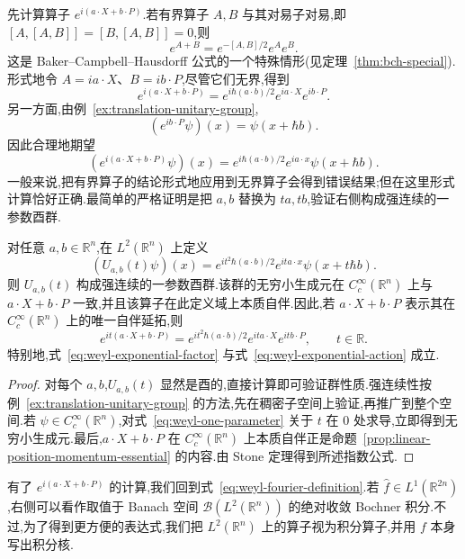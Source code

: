 先计算算子 $e^{i(a\cdot X+b\cdot P)}$.若有界算子 $A,B$ 与其对易子对易,即 $[A,[A,B]]=[B,[A,B]]=0$,则
\[
e^{A+B}=e^{-[A,B]/2}e^Ae^B.
\label{eq:bch-special}
\]
这是 Baker--Campbell--Hausdorff 公式的一个特殊情形(见定理~\ref{thm:bch-special}).形式地令 $A=ia\cdot X$、$B=ib\cdot P$,尽管它们无界,得到
\[
e^{i(a\cdot X+b\cdot P)}=e^{i\hbar(a\cdot b)/2}e^{ia\cdot X}e^{ib\cdot P}.
\label{eq:weyl-exponential-factor}
\]
另一方面,由例~\ref{ex:translation-unitary-group},
\[
(e^{ib\cdot P}\psi)(x)=\psi(x+\hbar b).
\]
因此合理地期望
\[
\left(e^{i(a\cdot X+b\cdot P)}\psi\right)(x)
=e^{i\hbar(a\cdot b)/2}e^{ia\cdot x}\psi(x+\hbar b).
\label{eq:weyl-exponential-action}
\]
一般来说,把有界算子的结论形式地应用到无界算子会得到错误结果;但在这里形式计算恰好正确.最简单的严格证明是把 $a,b$ 替换为 $ta,tb$,验证右侧构成强连续的一参数酉群.

\begin{proposition}\label{prop:weyl-one-parameter}
对任意 $a,b\in\mathbb R^n$,在 $L^2(\mathbb R^n)$ 上定义
\[
(U_{a,b}(t)\psi)(x)=e^{it^2\hbar(a\cdot b)/2}e^{ita\cdot x}\psi(x+t\hbar b).
\label{eq:weyl-one-parameter}
\]
则 $U_{a,b}(t)$ 构成强连续的一参数酉群.该群的无穷小生成元在 $C_c^\infty(\mathbb R^n)$ 上与 $a\cdot X+b\cdot P$ 一致,并且该算子在此定义域上本质自伴.因此,若 $a\cdot X+b\cdot P$ 表示其在 $C_c^\infty(\mathbb R^n)$ 上的唯一自伴延拓,则
\[
e^{it(a\cdot X+b\cdot P)}
=e^{it^2\hbar(a\cdot b)/2}e^{ita\cdot X}e^{itb\cdot P},
\qquad t\in\mathbb R.
\]
特别地,式~\eqref{eq:weyl-exponential-factor} 与式~\eqref{eq:weyl-exponential-action} 成立.
\end{proposition}

\begin{proof}
对每个 $a,b$,$U_{a,b}(t)$ 显然是酉的,直接计算即可验证群性质.强连续性按例~\ref{ex:translation-unitary-group} 的方法,先在稠密子空间上验证,再推广到整个空间.若 $\psi\in C_c^\infty(\mathbb R^n)$,对式~\eqref{eq:weyl-one-parameter} 关于 $t$ 在 $0$ 处求导,立即得到无穷小生成元.最后,$a\cdot X+b\cdot P$ 在 $C_c^\infty(\mathbb R^n)$ 上本质自伴正是命题~\ref{prop:linear-position-momentum-essential} 的内容.由 Stone 定理得到所述指数公式.
\end{proof}

有了 $e^{i(a\cdot X+b\cdot P)}$ 的计算,我们回到式~\eqref{eq:weyl-fourier-definition}.若 $\widehat f\in L^1(\mathbb R^{2n})$,右侧可以看作取值于 Banach 空间 $\mathcal B(L^2(\mathbb R^n))$ 的绝对收敛 Bochner 积分.不过,为了得到更方便的表达式,我们把 $L^2(\mathbb R^n)$ 上的算子视为积分算子,并用 $f$ 本身写出积分核.


